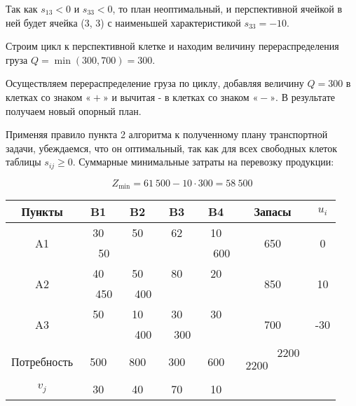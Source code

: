 \documentclass[a4paper,12pt]{article}
\begin{document}
	Так как $s_{13} < 0$ и $s_{33} < 0$, то план неоптимальный, и перспективной ячейкой в ней будет ячейка (3, 3) с наименьшей характеристикой $s_{33} = - 10$. 
	
	Строим цикл к перспективной клетке и находим величину перераспределения груза $Q = \min(300, 700) = 300$.
	
	Осуществляем перераспределение груза по циклу, добавляя величину $Q = 300$ в клетках со знаком $«+»$ и вычитая - в клетках со знаком $«-»$. В результате получаем новый опорный план.
	
	Применяя правило пункта 2 алгоритма к полученному плану транспортной задачи, убеждаемся, что он оптимальный, так как для всех свободных клеток таблицы $s_{ij} \geqslant 0$. Суммарные минимальные затраты на перевозку продукции:
	
	\[
		Z_{\min} = 61 \ 500 - 10 \cdot 300 = 58 \ 500
	\]
	
	\begin{center}
		\begin{tabular}{|c|c|c|c|c|c|c|c|c|cc}
			\hline
			Пункты & \multicolumn{2}{c|}{B1} & \multicolumn{2}{c|}{B2} & \multicolumn{2}{c|}{B3} & \multicolumn{2}{c|}{B4} & \multicolumn{1}{c|}{Запасы} & \multicolumn{1}{c|}{$u_i$} \\ \hline
			\multirow{2}{*}{A1} & \multicolumn{2}{c|}{30} & \multicolumn{2}{c|}{50} & \multicolumn{2}{c|}{62} & \multicolumn{2}{c|}{10} & \multicolumn{1}{c|}{\multirow{2}{*}{650}} & \multicolumn{1}{c|}{\multirow{2}{*}{0}} \\ \cline{2-9}
			&  & 50 &  &  &  &  &  & 600 & \multicolumn{1}{c|}{} & \multicolumn{1}{c|}{} \\ \hline
			\multirow{2}{*}{A2} & \multicolumn{2}{c|}{40} & \multicolumn{2}{c|}{50} & \multicolumn{2}{c|}{80} & \multicolumn{2}{c|}{20} & \multicolumn{1}{c|}{\multirow{2}{*}{850}} & \multicolumn{1}{c|}{\multirow{2}{*}{10}} \\ \cline{2-9}
			&  & 450 &  & 400 &  &  &  &  & \multicolumn{1}{c|}{} & \multicolumn{1}{c|}{} \\ \hline
			\multirow{2}{*}{A3} & \multicolumn{2}{c|}{50} & \multicolumn{2}{c|}{10} & \multicolumn{2}{c|}{30} & \multicolumn{2}{c|}{30} & \multicolumn{1}{c|}{\multirow{2}{*}{700}} & \multicolumn{1}{c|}{\multirow{2}{*}{-30}} \\ \cline{2-9}
			&  &  &  & 400 &  & 300 &  &  & \multicolumn{1}{c|}{} & \multicolumn{1}{c|}{} \\ \hline
			Потребность & \multicolumn{2}{c|}{500} & \multicolumn{2}{c|}{800} & \multicolumn{2}{c|}{300} & \multicolumn{2}{c|}{600} & \multicolumn{1}{c|}{$\begin{matrix}
					& 2200 \\
					2200 & \\
				\end{matrix}$} &  \\ \cline{1-10}
			$v_j$ & \multicolumn{2}{c|}{30} & \multicolumn{2}{c|}{40} & \multicolumn{2}{c|}{70} & \multicolumn{2}{c|}{10} &  &  \\ \cline{1-9}
		\end{tabular}
	\end{center}
	
\end{document}
